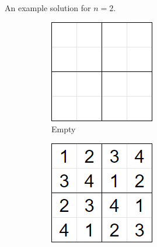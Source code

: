 An example solution for $n=2$.

\begin{figure}[H]
  \centering
  \begin{subfigure}{.25\linewidth}
  \end{subfigure}
  \begin{subfigure}{.25\linewidth}
    \centering
    \includegraphics[width=\linewidth]{content/assets/03_grovers_algorithm/sudoku_2_empty.png}
    \caption{Empty}
  \end{subfigure}
  \begin{subfigure}{.25\linewidth}
    \centering
    \includegraphics[width=\linewidth]{content/assets/03_grovers_algorithm/sudoku_2_solution.png}

\end{subfigure}
\end{figure}
